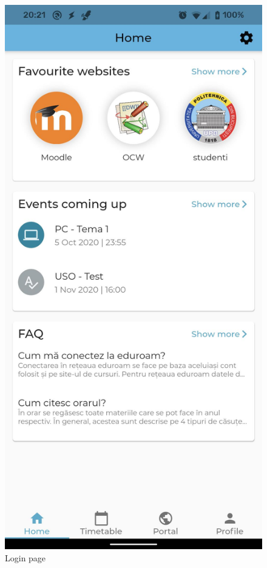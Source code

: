 \begin{figure}[!ht]
\begin{minipage}[b]{0.32\textwidth}
        \caption{Login page}
        \label{4:fig:login}
    \end{minipage}
    \hfill
    \begin{minipage}[b]{0.32\textwidth}
        \captionsetup{justification=centering}
        \includegraphics[width=\textwidth]{figures/app/flutter/home.jpg}

\end{minipage}
\end{figure}

